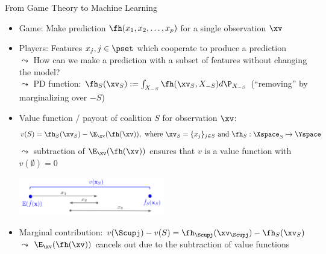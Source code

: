 \documentclass[11pt,compress,t,notes=noshow, aspectratio=169, xcolor=table]{beamer}
\begin{document}
\begin{frame}{From Game Theory to Machine Learning}
\begin{itemize}[<+->]
    \item Game: Make prediction $\fh(x_1, x_2, \ldots, x_p)$ for a single observation $\xv$
    \item Players: Features $x_j, j \in \pset$ which cooperate to produce a prediction\\
    $\leadsto$ How can we make a prediction with a subset of features without changing the model?
    \\ 
    $\leadsto$ PD function: $\fh_{S}(\xv_S) := \int_{X_{-S}} \fh(\xv_S, X_{-S})d \P_{X_{-S}}$ (``removing'' by marginalizing over $-S$)
    \item  Value function / payout of coalition $S$ for observation $\xv$:
    $$v(S) =  \fh_{S} (\xv_S) - \E_{\xv}(\fh(\xv)), \text{ where } \xv_S = \{x_j\}_{j \in S} \text{ and } \fh_S: \Xspace_S \mapsto \Yspace$$
    $\leadsto$ subtraction of $\E_{\xv}(\fh(\xv))$ ensures that $v$ is a value function with $v(\emptyset) = 0$
    \centerline{\includegraphics[width=0.5\textwidth, trim=20 0 0 100, clip]{figure_man/shapley_valuefct}}
    \item Marginal contribution: $v(\Scupj) - v(S) =  \fh_{\Scupj} (\xv_{\Scupj}) - \fh_{S} (\xv_{S})$\\
    $\leadsto$ $\E_{\xv}(\fh(\xv))$ cancels out due to the subtraction of value functions
\end{itemize}
\end{frame}
\end{document}
